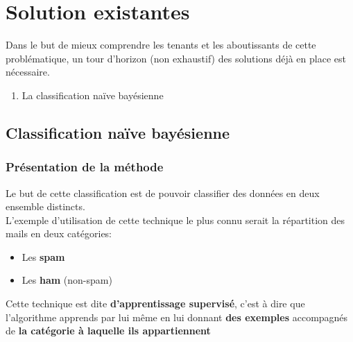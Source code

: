 \chapter{Solution existantes}
    Dans le but de mieux comprendre les tenants et les aboutissants de cette problématique, un tour d'horizon (non exhaustif) des solutions déjà en place est nécessaire.
    \begin{enumerate}
        \item La classification naïve bayésienne
    \end{enumerate}
    \section{Classification naïve bayésienne}
        \subsection{Présentation de la méthode}
            Le but de cette classification est de pouvoir classifier des données en deux ensemble distincts.\\
            L'exemple d'utilisation de cette technique le plus connu serait la répartition des mails en deux catégories:
            \begin{itemize}
                \item Les \textbf{spam}
                \item Les \textbf{ham} (non-spam)
            \end{itemize}
            Cette technique est dite \textbf{d'apprentissage supervisé}, c'est à dire que l'algorithme apprends par lui même en lui donnant \textbf{des exemples} accompagnés de \textbf{la catégorie à laquelle ils appartiennent}
